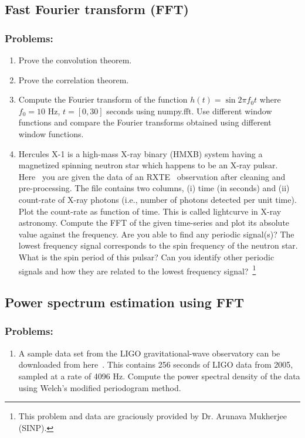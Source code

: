 \subsection{Fast Fourier transform (FFT)}
\subsubsection{Problems:}
\begin{enumerate}
\item Prove the convolution theorem. 
\item Prove the correlation theorem. 
\item Compute the Fourier transform of the function $h(t) = \sin 2 \pi f_0 t$ where $f_0 = 10$ Hz, $t = [0, 30]$ seconds using numpy.fft. Use different window functions and compare the Fourier transforms obtained using different window functions.   
\item Hercules X-1 is a high-mass X-ray binary (HMXB) system having a magnetized spinning neutron star which happens to be an X-ray pulsar. Here~\cite{rxte-data} you are given the data of an RXTE~\cite{rxte} observation after cleaning and pre-processing. The file contains two columns, (i) time (in seconds) and (ii) count-rate of X-ray photons (i.e., number of photons detected per unit time). Plot the count-rate as function of time. This is called lightcurve in X-ray astronomy. Compute the FFT of the given time-series and plot its absolute value against the frequency. Are you able to find any periodic signal(s)? The lowest frequency signal corresponds to the spin frequency of the neutron star.  What is the spin period of this pulsar? Can you identify other periodic signals and how they are related to the lowest frequency signal?~\footnote{This problem and data are graciously provided by Dr. Arunava Mukherjee (SINP).}
\end{enumerate}

\subsection{Power spectrum estimation using FFT}
\subsubsection{Problems:}
\begin{enumerate}
\item A sample data set from the LIGO gravitational-wave observatory can be downloaded from here~\cite{ligo-data}. This contains 256 seconds of LIGO data from 2005, sampled at a rate of 4096 Hz. Compute the power spectral density of the data using Welch's modified periodogram method. 
\end{enumerate}



